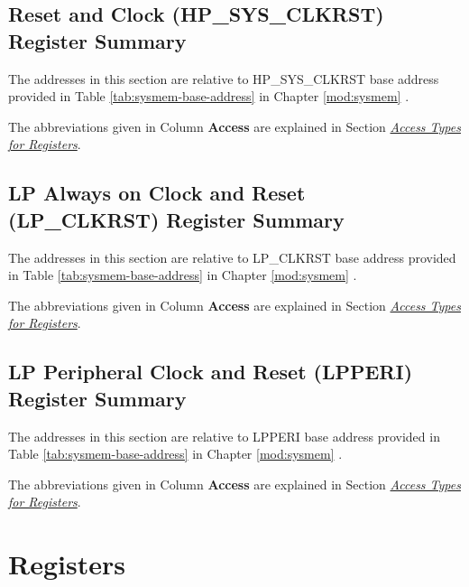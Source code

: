 \documentclass[main\_\_EN.tex]{subfiles}
\begin{document}
\subsection{Reset and Clock (HP\_SYS\_CLKRST) Register Summary}

The addresses in this section are relative to HP\_SYS\_CLKRST base address provided in Table \ref{tab:sysmem-base-address} in Chapter \ref{mod:sysmem} \textit{}.

The abbreviations given in Column \textbf{Access} are explained in Section \hyperref[glossary-access-types]{\textit{Access Types for Registers}}.



\subsection{LP Always on Clock and Reset (LP\_CLKRST) Register Summary}

The addresses in this section are relative to LP\_CLKRST base address provided in Table \ref{tab:sysmem-base-address} in Chapter \ref{mod:sysmem} \textit{}.

The abbreviations given in Column \textbf{Access} are explained in Section \hyperref[glossary-access-types]{\textit{Access Types for Registers}}.



\subsection{LP Peripheral Clock and Reset (LPPERI) Register Summary}

The addresses in this section are relative to LPPERI base address provided in Table \ref{tab:sysmem-base-address} in Chapter \ref{mod:sysmem} \textit{}.

The abbreviations given in Column \textbf{Access} are explained in Section \hyperref[glossary-access-types]{\textit{Access Types for Registers}}.





\newpage
\section{Registers}
\end{document}
